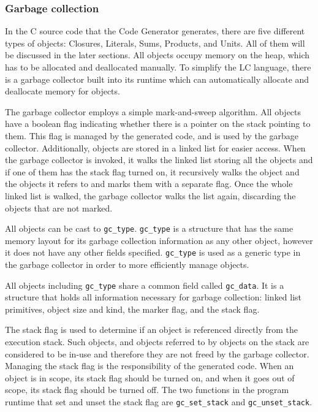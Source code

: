 \documentclass[12pt]{article}
\begin{document}
\subsubsection{Garbage collection}

In the C source code that the Code Generator generates, there are five different
types of objects: Closures, Literals, Sums, Products, and Units. All of them
will be discussed in the later sections. All objects occupy memory on the heap,
which has to be allocated and deallocated manually. To simplify the LC language,
there is a garbage collector built into its runtime which can automatically
allocate and deallocate memory for objects. 

The garbage collector employs a simple mark-and-sweep algorithm. All objects
have a boolean flag indicating whether there is a pointer on the stack pointing
to them. This flag is managed by the generated code, and is used by the garbage
collector. Additionally, objects are stored in a linked list for easier access.
When the garbage collector is invoked, it walks the linked list storing all the
objects and if one of them has the stack flag turned on, it recursively walks
the object and the objects it refers to and marks them with a separate flag.
Once the whole linked list is walked, the garbage collector walks the list
again, discarding the objects that are not marked.

All objects can be cast to \verb$gc_type$. \verb$gc_type$ is a structure that
has the same memory layout for its garbage collection information as any other
object, however it does not have any other fields specified. \verb$gc_type$ is
used as a generic type in the garbage collector in order to more efficiently
manage objects.

All objects including \verb$gc_type$ share a common field called
\verb$gc_data$. It is a structure that holds all information necessary for
garbage collection: linked list primitives, object size and kind, the marker
flag, and the stack flag.

The stack flag is used to determine if an object is referenced directly from the
execution stack. Such objects, and objects referred to by objects on the stack
are considered to be in-use and therefore they are not freed by the garbage
collector. Managing the stack flag is the responsibility of the generated code.
When an object is in scope, its stack flag should be turned on, and when it goes
out of scope, its stack flag should be turned off. The two functions in the
program runtime that set and unset the stack flag are \verb$gc_set_stack$ and
\verb$gc_unset_stack$.
\end{document}
